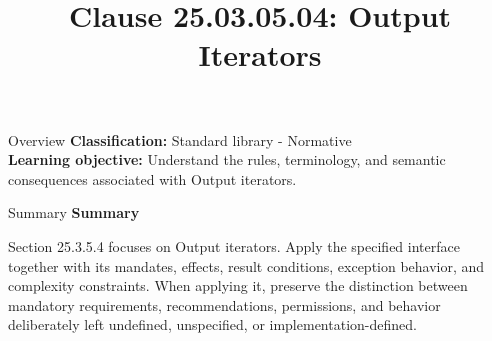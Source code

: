 \documentclass[10pt,letterpaper]{article}
\title{Clause 25.03.05.04: Output Iterators}
\author{}
\date{}
\begin{document}
\maketitle
\begin{CornellOverviewBox}{Overview}
\textbf{Classification:} Standard library - Normative\\[2pt]
\textbf{Learning objective:} Understand the rules, terminology, and semantic consequences associated with Output iterators.
\end{CornellOverviewBox}\begin{CornellSummaryBox}{Summary}
{\sffamily\bfseries\color{Accent} Summary}\par\vspace{3pt}Section 25.3.5.4 focuses on Output iterators. Apply the specified interface together with its mandates, effects, result conditions, exception behavior, and complexity constraints. When applying it, preserve the distinction between mandatory requirements, recommendations, permissions, and behavior deliberately left undefined, unspecified, or implementation-defined.
\end{CornellSummaryBox}
\end{document}
